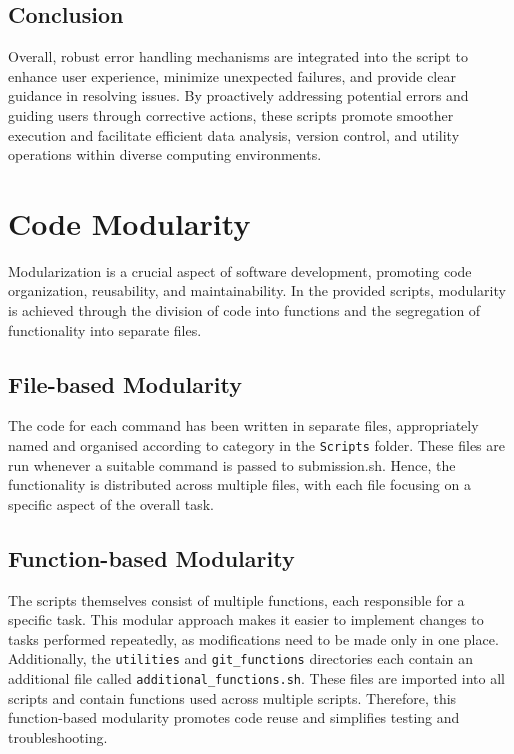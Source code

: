 \documentclass{article}
\begin{document}
\subsection{Conclusion}
Overall, robust error handling mechanisms are integrated into the script to enhance user experience, minimize unexpected failures, and provide clear guidance in resolving issues. By proactively addressing potential errors and guiding users through corrective actions, these scripts promote smoother execution and facilitate efficient data analysis, version control, and utility operations within diverse computing environments.

\section{Code Modularity}

Modularization is a crucial aspect of software development, promoting code organization, reusability, and maintainability. In the provided scripts, modularity is achieved through the division of code into functions and the segregation of functionality into separate files.\\

\subsection{File-based Modularity}

The code for each command has been written in separate files, appropriately named and organised according to category in the \texttt{Scripts} folder. These files are run whenever a suitable command is passed to submission.sh. Hence, the functionality is distributed across multiple files, with each file focusing on a specific aspect of the overall task.\\

\subsection{Function-based Modularity}

The scripts themselves consist of multiple functions, each responsible for a specific task. This modular approach makes it easier to implement changes to tasks performed repeatedly, as modifications need to be made only in one place. Additionally, the \texttt{utilities} and \texttt{git\_functions} directories each contain an additional file called \texttt{additional\_functions.sh}. These files are imported into all scripts and contain functions used across multiple scripts. Therefore, this function-based modularity promotes code reuse and simplifies testing and troubleshooting.
\end{document}
